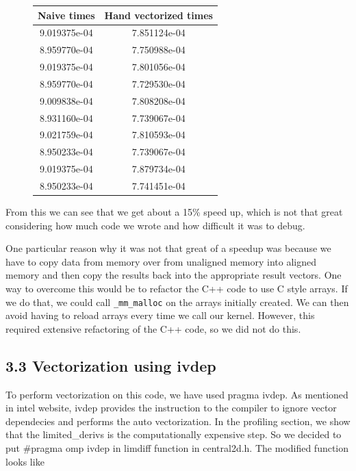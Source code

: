 \documentclass[11pt]{article}
\begin{document}
        \begin{figure}[H]
            \centering
            \begin{tabular}{c | c}
            Naive times & Hand vectorized times\\
            \hline
            9.019375e-04 & 7.851124e-04 \\
            8.959770e-04 & 7.750988e-04 \\
            9.019375e-04 & 7.801056e-04 \\
            8.959770e-04 & 7.729530e-04 \\
            9.009838e-04 & 7.808208e-04 \\
            8.931160e-04 & 7.739067e-04 \\
            9.021759e-04 & 7.810593e-04 \\
            8.950233e-04 & 7.739067e-04 \\
            9.019375e-04 & 7.879734e-04 \\
            8.950233e-04 & 7.741451e-04
            \end{tabular}
        \end{figure}

        From this we can see that we get about a 15\% speed up, which is not that great considering how much code we wrote and how difficult it was to debug.

        One particular reason why it was not that great of a speedup was because we have to copy data from memory over from unaligned memory into aligned memory and then copy the results back into the appropriate result vectors. One way to overcome this would be to refactor the C++ code to use C style arrays. If we do that, we could call \texttt{\_mm\_malloc} on the arrays initially created. We can then avoid having to reload arrays every time we call our kernel. However, this required extensive refactoring of the C++ code, so we did not do this.

    \subsection{3.3 Vectorization using ivdep}
        To perform vectorization on this code, we have used pragma ivdep. As mentioned in intel website, ivdep provides the instruction to the compiler to ignore vector dependecies and performs the auto vectorization.  In the profiling section, we show that the limited\_derivs is the computationally expensive step. So we decided to put \#pragma omp ivdep in limdiff function in central2d.h. The modified function looks like
\end{document}
